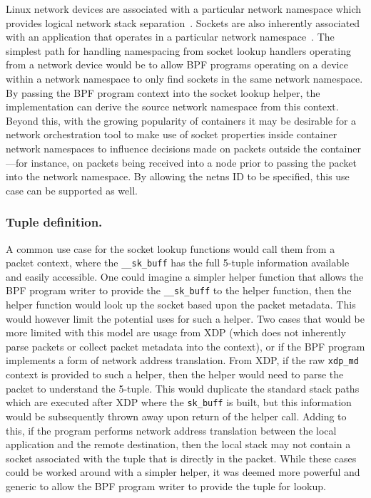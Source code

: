 \documentclass[10pt,sigconf,authorversion]{lpc}
\begin{document}
Linux network devices are associated with a particular network namespace which
provides logical network stack separation~\cite{netns, netns-netdevice}.
Sockets are also inherently associated with an application that operates in a
particular network namespace~\cite{netns-sock}. The simplest path for handling
namespacing from socket lookup handlers operating from a network device would
be to allow BPF programs operating on a device within a network namespace to
only find sockets in the same network namespace. By passing the BPF program
context into the socket lookup helper, the implementation can derive the source
network namespace from this context. Beyond this, with the growing popularity
of containers it may be desirable for a network orchestration tool to make use
of socket properties inside container network namespaces to influence decisions
made on packets outside the container---for instance, on packets being received
into a node prior to passing the packet into the network namespace. By allowing
the netns ID to be specified, this use case can be supported as well.

\subsubsection{Tuple definition.}

A common use case for the socket lookup functions would call them from a packet
context, where the \verb+__sk_buff+ has the full 5-tuple information available
and easily accessible. One could imagine a simpler helper function that allows
the BPF program writer to provide the \verb+__sk_buff+ to the helper function,
then the helper function would look up the socket based upon the packet
metadata. This would however limit the potential uses for such a helper. Two
cases that would be more limited with this model are usage from XDP (which does
not inherently parse packets or collect packet metadata into the context), or
if the BPF program implements a form of network address translation. From XDP,
if the raw \verb+xdp_md+ context is provided to such a helper, then the helper
would need to parse the packet to understand the 5-tuple. This would duplicate
the standard stack paths which are executed after XDP where the \verb+sk_buff+
is built, but this information would be subsequently thrown away upon return of
the helper call. Adding to this, if the program performs network address
translation between the local application and the remote destination, then the
local stack may not contain a socket associated with the tuple that is directly
in the packet. While these cases could be worked around with a simpler helper,
it was deemed more powerful and generic to allow the BPF program writer to
provide the tuple for lookup.
\end{document}
